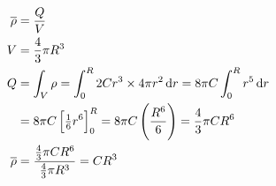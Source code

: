 \begin{align*}
    \overline{\rho} & = \frac{Q}{V}\\
    V & = \frac{4}{3} \pi R^3\\
    Q & = \int_V \rho = \int_0^R 2Cr^3 \times 4 \pi r^2 \dif r = 8 \pi C \int_0^R r^5 \dif r\\
    & = 8 \pi C \sbr{\tfrac{1}{6} r^6}_0^R = 8 \pi C \del{\frac{R^6}{6}} = \frac{4}{3} \pi C R^6\\
    \overline{\rho} & = \frac{\tfrac{4}{3} \pi C R^6}{\tfrac{4}{3} \pi R^3} = CR^3
\end{align*}
